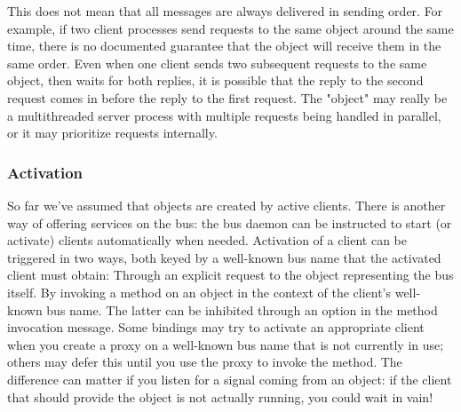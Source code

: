 \documentclass{myproc}
\begin{document}
This does not mean that all messages are always delivered in sending
order. For example, if two client processes send requests to the same object
around the same time, there is no documented guarantee that the object will
receive them in the same order. Even when one client sends two subsequent
requests to the same object, then waits for both replies, it is possible that
the reply to the second request comes in before the reply to the first
request. The "object" may really be a multithreaded server process with
multiple requests being handled in parallel, or it may prioritize requests
internally. 

\subsubsection{Activation}
So far we've assumed that objects are created by active clients. There is another way of offering services on the bus: the bus daemon can be instructed to start (or activate) clients automatically when needed. Activation of a client can be triggered in two ways, both keyed by a well-known bus name that the activated client must obtain:
\ben
\w Through an explicit request to the object representing the bus itself.
\w By invoking a method on an object in the context of the client's well-known bus name. 
\een
The latter can be inhibited through an option in the method invocation message. Some bindings may try to activate an appropriate client when you create a proxy on a well-known bus name that is not currently in use; others may defer this until you use the proxy to invoke the method. The difference can matter if you listen for a signal coming from an object: if the client that should provide the object is not actually running, you could wait in vain!


\end{document}

